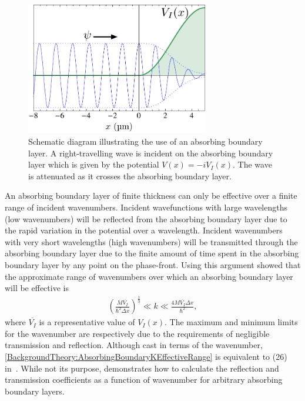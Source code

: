 \begin{figure}
    \centering
    \includegraphics[width=8cm]{AbsorbingBoundarySchematic}
    \caption{
        \label{BackgroundTheory:AbsorbingBoundarySchematic}
        Schematic diagram illustrating the use of an absorbing boundary layer. A right-travelling wave is incident on the absorbing boundary layer which is given by the potential $V(x) = -i V_I(x)$. The wave is attenuated as it crosses the absorbing boundary layer.
    }
\end{figure}

An absorbing boundary layer of finite thickness can only be effective over a finite range of incident wavenumbers. Incident wavefunctions with large wavelengths (low wavenumbers) will be reflected from the absorbing boundary layer due to the rapid variation in the potential over a wavelength. Incident wavenumbers with very short wavelengths (high wavenumbers) will be transmitted through the absorbing boundary layer due to the finite amount of time spent in the absorbing boundary layer by any point on the phase-front.  Using this argument \citet{Neuhasuer:1989} showed that the approximate range of wavenumbers over which an absorbing boundary layer will be effective is
\begin{align}
    \label{BackgroundTheory:AbsorbingBoundaryKEffectiveRange}
    \left( \frac{M \overline{V_I}}{\hbar^2 \Delta x}\right)^{\frac{1}{3}} \ll k \ll \frac{4 M \overline{V_I} \Delta x}{\hbar^2},
\end{align}
where $\overline{V_I}$ is a representative value of $V_I(x)$. The maximum and minimum limits for the wavenumber are respectively due to the requirements of negligible transmission and reflection. Although cast in terms of the wavenumber, \eqref{BackgroundTheory:AbsorbingBoundaryKEffectiveRange} is equivalent to (26) in~\citep{Neuhasuer:1989}. While not its purpose,  demonstrates how to calculate the reflection and transmission coefficients as a function of wavenumber for arbitrary absorbing boundary layers.

